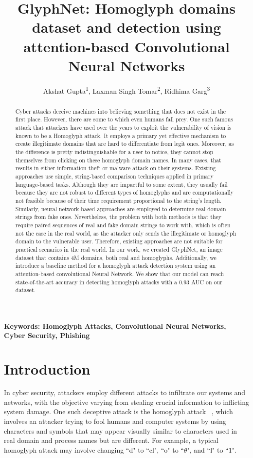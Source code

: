 \documentclass[letterpaper]{article} \usepackage{aaai22}  \usepackage{times}  \usepackage{helvet}  \usepackage{courier}  \usepackage[hyphens]{url}  \usepackage{graphicx} \urlstyle{rm} \def\UrlFont{\rm}  \usepackage{natbib}  \usepackage{caption} \DeclareCaptionStyle{ruled}{labelfont=normalfont,labelsep=colon,strut=off} \frenchspacing  \setlength{\pdfpagewidth}{8.5in}  \setlength{\pdfpageheight}{11in}  \usepackage{algorithm}
\title{GlyphNet: Homoglyph domains dataset and detection using attention-based Convolutional Neural Networks}
\author{
Akshat Gupta\textsuperscript{\rm 1},
    Laxman Singh Tomar\equalcontrib \textsuperscript{\rm 2},
    Ridhima Garg\equalcontrib \textsuperscript{\rm 3}
}
\begin{document}
\maketitle

\begin{abstract}
Cyber attacks deceive machines into believing something that does not exist in the first place. However, there are some to which even humans fall prey. One such famous attack that attackers have used over the years to exploit the vulnerability of vision is known to be a Homoglyph attack. It employs a primary yet effective mechanism to create illegitimate domains that are hard to differentiate from legit ones. Moreover, as the difference is pretty indistinguishable for a user to notice, they cannot stop themselves from clicking on these homoglyph domain names.
In many cases, that results in either information theft or malware attack on their systems. Existing approaches use simple, string-based comparison techniques applied in primary language-based tasks. Although they are impactful to some extent, they usually fail because they are not robust to different types of homoglyphs and are computationally not feasible because of their time requirement proportional to the string's length.
Similarly, neural network-based approaches are employed to determine real domain strings from fake ones. Nevertheless, the problem with both methods is that they require paired sequences of real and fake domain strings to work with, which is often not the case in the real world, as the attacker only sends the illegitimate or homoglyph domain to the vulnerable user. Therefore, existing approaches are not suitable for practical scenarios in the real world. In our work, we created GlyphNet, an image dataset that contains 4M domains, both real and homoglyphs. Additionally, we introduce a baseline method for a homoglyph attack detection system using an attention-based convolutional Neural Network. We show that our model can reach state-of-the-art accuracy in detecting homoglyph attacks with a 0.93 AUC on our dataset. 
\end{abstract}

\textbf{Keywords: Homoglyph Attacks, Convolutional Neural Networks, Cyber Security, Phishing}

\section{Introduction}
In cyber security, attackers employ different attacks to infiltrate our systems and networks, with the objective varying from stealing crucial information to inflicting system damage. One such deceptive attack is the homoglyph attack ~\cite{woodbridge2018detecting}, which involves an attacker trying to fool humans and computer systems by using characters and symbols that may appear visually similar to characters used in real domain and process names but are different. For example, a typical homoglyph attack may involve changing ``d" to ``cl", ``o" to ``$\theta$", and ``l" to ``1". 
\end{document}

